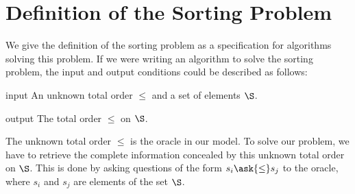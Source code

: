 \section{Definition of the Sorting Problem}
\label{tree:sorting:def}

We give the definition of the sorting problem as a specification for algorithms
solving this problem.
If we were writing an algorithm to solve the sorting problem, the input and output
conditions could be described as follows:
\begin{problem}[Sorting]\mbox{}
\begin{steps}
\item[input] An unknown total order \(\le\) and a set of elements \(\S\).
\item[output] The total order \(\le\) on \(\S\).
\end{steps}
\end{problem}

The unknown total order \(\le\) is the oracle in our model. To solve our
problem, we have to retrieve the complete information concealed by this
unknown total order on \(\S\). This is done by asking questions of the
form \(s_i \ask{\le} s_j\) to the oracle, where \(s_i\) and \(s_j\) are
elements of the set \(\S\).


